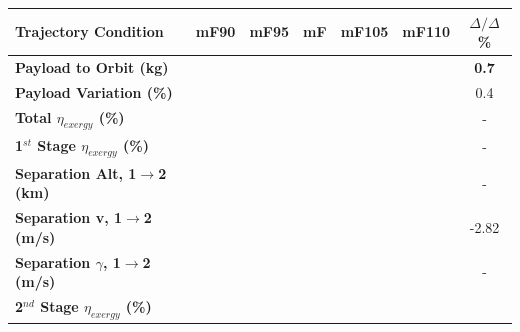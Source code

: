\begin{table}[ht]
	\centering
\begin{tabular}{l c c c c c c} 
	\hline \textbf{Trajectory Condition}
	&mF90
	&mF95
	&mF
	&mF105
	&mF110
	& $\Delta/\Delta$\%
	\\
	\hline \textbf{Payload to Orbit (kg)}
	& \textbf{\PayloadToOrbitmFuelNinety}
	& \textbf{\PayloadToOrbitmFuelNinetyFive}
	& \textbf{\PayloadToOrbitmFuelStandard}
	& \textbf{\PayloadToOrbitmFuelOneHundredFive}
	& \textbf{\PayloadToOrbitmFuelOneHundredTen}
	&\textbf{0.7}
	\\
	\textbf{Payload Variation (\%)}
	& \PayloadVarmFuelNinety
	& \PayloadVarmFuelNinetyFive
	& \PayloadVarmFuelStandard
	& \PayloadVarmFuelOneHundredFive
	& \PayloadVarmFuelOneHundredTen
	&0.4
	\\
	\textbf{Total $\eta_{exergy}$ (\%)}
	& \textbf{\totalExergyEffmFuelNinety}
	& \textbf{\totalExergyEffmFuelNinetyFive}
	& \textbf{\totalExergyEffmFuelStandard}
	& \textbf{\totalExergyEffmFuelOneHundredFive}
	& \textbf{\totalExergyEffmFuelOneHundredTen}
	& -
	\\
	\hline 
	\textbf{1$^{st}$ Stage $\eta_{exergy}$ (\%)}
	& \textbf{\firstExergyEffmFuelNinety}
	& \textbf{\firstExergyEffmFuelNinetyFive}
	& \textbf{\firstExergyEffmFuelStandard}
	& \textbf{\firstExergyEffmFuelOneHundredFive}
	& \textbf{\firstExergyEffmFuelOneHundredTen}
	& -
	\\
	\textbf{Separation Alt, 1$\rightarrow$2 (km)}
	& \firstsecondSeparationAltmFuelNinety
	& \firstsecondSeparationAltmFuelNinetyFive
	& \firstsecondSeparationAltmFuelStandard
	& \firstsecondSeparationAltmFuelOneHundredFive
	& \firstsecondSeparationAltmFuelOneHundredTen
	& -
	\\
	\textbf{Separation v, 1$\rightarrow$2 (m/s)}
	& \firstsecondSeparationvmFuelNinety
	& \firstsecondSeparationvmFuelNinetyFive
	& \firstsecondSeparationvmFuelStandard
	& \firstsecondSeparationvmFuelOneHundredFive
	& \firstsecondSeparationvmFuelOneHundredTen
	&-2.82
	\\
	\textbf{Separation $\gamma$, 1$\rightarrow$2 (m/s)}
	& \firstsecondSeparationgammamFuelNinety
	& \firstsecondSeparationgammamFuelNinetyFive
	& \firstsecondSeparationgammamFuelStandard
	& \firstsecondSeparationgammamFuelOneHundredFive
	& \firstsecondSeparationgammamFuelOneHundredTen
	& -
	\\
	\hline 
	\textbf{2$^{nd}$ Stage $\eta_{exergy}$ (\%)}
	& \textbf{\secondExergyEffmFuelNinety}
	& \textbf{\secondExergyEffmFuelNinetyFive}
	& \textbf{\secondExergyEffmFuelStandard}
	& \textbf{\secondExergyEffmFuelOneHundredFive}

\end{tabular}
\end{table}
